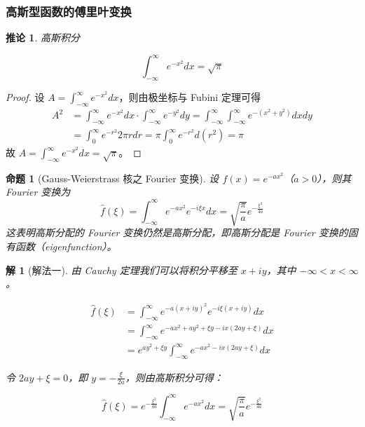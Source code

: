 \documentclass[12pt,a4paper]{article}
\theoremstyle{plain}
\newtheorem{proposition}[theorem]{命题}
\newtheorem{corollary}[theorem]{推论}  %
\newtheorem{solution}{解}
\theoremstyle{definition}
\theoremstyle{remark}
\begin{document}
\subsubsection{高斯型函数的傅里叶变换}
\begin{corollary}高斯积分
	
	\[
	\int_{-\infty}^{\infty} e^{-x^2} dx = \sqrt{\pi}
	\]
\end{corollary}

\begin{proof}
 设 \( A = \int_{-\infty}^{\infty} e^{-x^2} dx \)，则由极坐标与 Fubini 定理可得
\[
\begin{aligned}
	A^2 &= \int_{-\infty}^{\infty} e^{-x^2} dx \cdot \int_{-\infty}^{\infty} e^{-y^2} dy = \int_{-\infty}^{\infty} \int_{-\infty}^{\infty} e^{-(x^2 + y^2)} dx dy \\
	&= \int_{0}^{\infty} e^{-r^2} 2\pi r dr = \pi \int_{0}^{\infty} e^{-r^2} d(r^2) = \pi
\end{aligned}
\]
故 \( A = \int_{-\infty}^{\infty} e^{-x^2} dx = \sqrt{\pi} \)。
\end{proof}

\begin{proposition}[Gauss-Weierstrass 核之 Fourier 变换]
	设 \( f(x) = e^{-a x^2} \)（\( a > 0 \)），则其 Fourier 变换为
	\[
	\widehat{f}(\xi) = \int_{-\infty}^{\infty} e^{-a x^2} e^{-i \xi x} dx = \sqrt{\frac{\pi}{a}} e^{-\frac{\xi^2}{4a}}
	\]
	这表明高斯分配的 Fourier 变换仍然是高斯分配，即高斯分配是 Fourier 变换的固有函数（eigenfunction）。
\end{proposition}

\begin{solution}[解法一]
	由 Cauchy 定理我们可以将积分平移至 \( x + iy \)，其中 \( -\infty < x < \infty \)。
	
	\[
	\begin{aligned}
		\widehat{f}(\xi) &= \int_{-\infty}^{\infty} e^{-a(x+iy)^2} e^{-i\xi(x+iy)} dx \\
		&= \int_{-\infty}^{\infty} e^{-ax^2 + ay^2 + \xi y - ix(2ay + \xi)} dx \\
		&= e^{ay^2 + \xi y} \int_{-\infty}^{\infty} e^{-ax^2 - ix(2ay + \xi)} dx
	\end{aligned}
	\]
	
	令 \( 2ay + \xi = 0 \)，即 \( y = -\frac{\xi}{2a} \)，则由高斯积分可得：
	
	\[
	\widehat{f}(\xi) = e^{-\frac{\xi^2}{4a}} \int_{-\infty}^{\infty} e^{-ax^2} dx = \sqrt{\frac{\pi}{a}} e^{-\frac{\xi^2}{4a}}
	\]
	
\end{solution}
\end{document}

